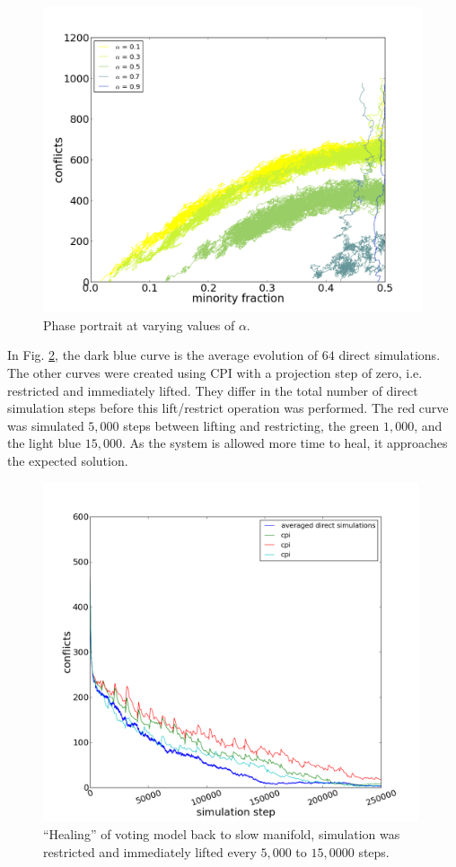 \documentclass[11pt]{article}
\begin{document}
\begin{figure}[h!]
  \centering
  \includegraphics[height=90mm]{vmPhasePortrait}
  \caption{Phase portrait at varying values of $\alpha$.}
  \label{fig:vmPP}
\end{figure}

In Fig. \ref{fig:vmHealing}, the dark blue curve is the average evolution of $64$ direct simulations. The other curves were created using CPI with a projection step of zero, i.e. restricted and immediately lifted. They differ in the total number of direct simulation steps before this lift/restrict operation was performed. The red curve was simulated $5,000$ steps between lifting and restricting, the green $1,000$, and the light blue $15,000$. As the system is allowed more time to heal, it approaches the expected solution.

\begin{figure}[h!]
  \centering
  \includegraphics[height=100mm]{vmHealing}
  \caption{``Healing'' of voting model back to slow manifold, simulation was restricted and immediately lifted every $5,000$ to $15,0000$ steps.}
  \label{fig:vmHealing}
\end{figure}
\end{document}
